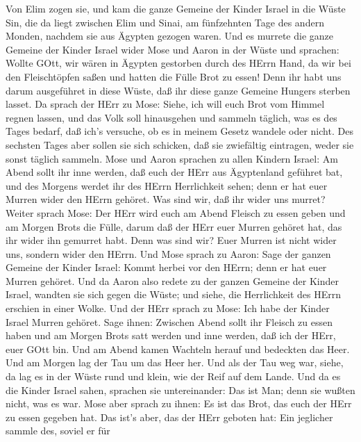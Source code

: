  Von Elim zogen sie, und kam die ganze Gemeine der Kinder
Israel in die Wüste Sin, die da liegt zwischen Elim und Sinai, am
fünfzehnten Tage des andern Monden, nachdem sie aus Ägypten gezogen
waren.  Und es murrete die ganze Gemeine der Kinder Israel
wider Mose und Aaron in der Wüste  und sprachen: Wollte
GOtt, wir wären in Ägypten gestorben durch des HErrn Hand, da wir bei
den Fleischtöpfen saßen und hatten die Fülle Brot zu essen! Denn ihr
habt uns darum ausgeführet in diese Wüste, daß ihr diese ganze Gemeine
Hungers sterben lasset.  Da sprach der HErr zu Mose: Siehe,
ich will euch Brot vom Himmel regnen lassen, und das Volk soll
hinausgehen und sammeln täglich, was es des Tages bedarf, daß ich's
versuche, ob es in meinem Gesetz wandele oder nicht.  Des
sechsten Tages aber sollen sie sich schicken, daß sie zwiefältig
eintragen, weder sie sonst täglich sammeln.  Mose und Aaron
sprachen zu allen Kindern Israel: Am Abend sollt ihr inne werden, daß
euch der HErr aus Ägyptenland geführet bat,  und des Morgens
werdet ihr des HErrn Herrlichkeit sehen; denn er hat euer Murren wider
den HErrn gehöret. Was sind wir, daß ihr wider uns murret? 
Weiter sprach Mose: Der HErr wird euch am Abend Fleisch zu essen geben
und am Morgen Brots die Fülle, darum daß der HErr euer Murren gehöret
hat, das ihr wider ihn gemurret habt. Denn was sind wir? Euer Murren ist
nicht wider uns, sondern wider den HErrn.  Und Mose sprach
zu Aaron: Sage der ganzen Gemeine der Kinder Israel: Kommt herbei vor
den HErrn; denn er hat euer Murren gehöret.  Und da Aaron
also redete zu der ganzen Gemeine der Kinder Israel, wandten sie sich
gegen die Wüste; und siehe, die Herrlichkeit des HErrn erschien in einer
Wolke.  Und der HErr sprach zu Mose:  Ich habe
der Kinder Israel Murren gehöret. Sage ihnen: Zwischen Abend sollt ihr
Fleisch zu essen haben und am Morgen Brots satt werden und inne werden,
daß ich der HErr, euer GOtt bin.  Und am Abend kamen
Wachteln herauf und bedeckten das Heer. Und am Morgen lag der Tau um das
Heer her.  Und als der Tau weg war, siehe, da lag es in der
Wüste rund und klein, wie der Reif auf dem Lande.  Und da
es die Kinder Israel sahen, sprachen sie untereinander: Das ist Man;
denn sie wußten nicht, was es war. Mose aber sprach zu ihnen: Es ist das
Brot, das euch der HErr zu essen gegeben hat.  Das ist's
aber, das der HErr geboten hat: Ein jeglicher sammle des, soviel er für
